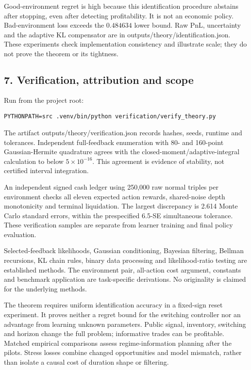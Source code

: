 \documentclass[
  10pt,
  a4paper,
]{article}
\begin{document}
Good-environment regret is high because this identification procedure
abstains after stopping, even after detecting profitability. It is not
an economic policy. Bad-environment loss exceeds the \(0.484634\) lower
bound. Raw PnL, uncertainty and the adaptive KL compensator are in
outputs/theory/identification.json. These experiments check
implementation consistency and illustrate scale; they do not prove the
theorem or its tightness.

\subsection{7. Verification, attribution and
scope}\label{verification-attribution-and-scope}

Run from the project root:

\begin{verbatim}
PYTHONPATH=src .venv/bin/python verification/verify_theory.py
\end{verbatim}

The artifact outputs/theory/verification.json records hashes, seeds,
runtime and tolerances. Independent full-feedback enumeration with 80-
and 160-point Gaussian-Hermite quadrature agrees with the
closed-moment/adaptive-integral calculation to below
\(5\times10^{-16}\). This agreement is evidence of stability, not
certified interval integration.

An independent signed cash ledger using 250,000 raw normal triples per
environment checks all eleven expected action rewards, shared-noise
depth monotonicity and terminal liquidation. The largest discrepancy is
2.614 Monte Carlo standard errors, within the prespecified 6.5-SE
simultaneous tolerance. These verification samples are separate from
learner training and final policy evaluation.

Selected-feedback likelihoods, Gaussian conditioning, Bayesian
filtering, Bellman recursions, KL chain rules, binary data processing
and likelihood-ratio testing are established methods. The environment
pair, all-action cost argument, constants and benchmark application are
task-specific derivations. No originality is claimed for the underlying
methods.

The theorem requires uniform identification accuracy in a fixed-sign
reset experiment. It proves neither a regret bound for the switching
controller nor an advantage from learning unknown parameters. Public
signal, inventory, switching and horizon change the full problem;
informative trades can be profitable. Matched empirical comparisons
assess regime-information planning after the pilots. Stress losses
combine changed opportunities and model mismatch, rather than isolate a
causal cost of duration shape or filtering.
\end{document}
